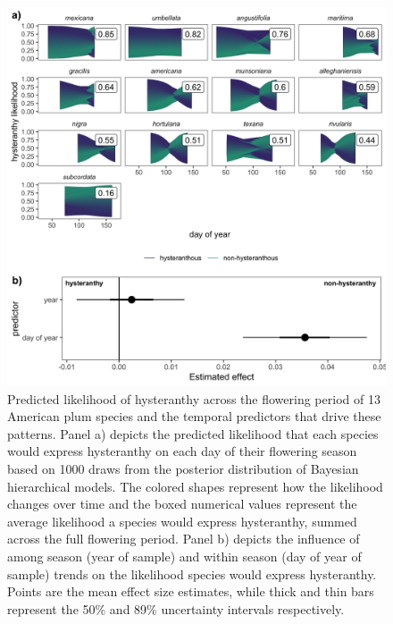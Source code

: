 \documentclass{article}[12pt]
\begin{document}
{\begin{figure}[h!]
    \centering
 \includegraphics[width=\textwidth]{..//..//Plots/whatReviwerswant/sps_preds.jpeg}  %
    \caption{Predicted likelihood of hysteranthy across the flowering period of 13 American plum species and the temporal predictors that drive these patterns. Panel a) depicts the predicted likelihood that each species would express hysteranthy on each day of their flowering season based on 1000 draws from the posterior distribution of Bayesian hierarchical models. The colored shapes represent how the likelihood changes over time and the boxed numerical values represent the average likelihood a species would express hysteranthy, summed across the full flowering period. %
    Panel b) depicts the influence of among season (year of sample) and within season (day of year of sample) trends on the likelihood species would express hysteranthy. Points are the mean effect size estimates, while thick and thin bars represent the 50\% and 89\% uncertainty intervals respectively.} 
    


\end{figure}}
\end{document}
